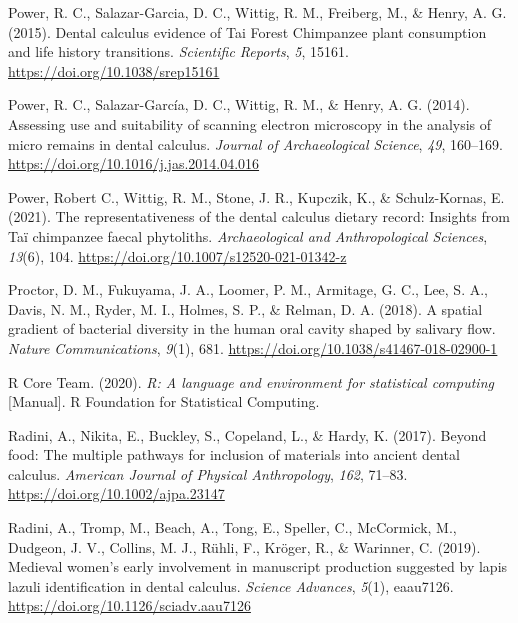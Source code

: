 \documentclass[
  b5paper,
]{book}
\newlength{\cslhangindent}
\newenvironment{CSLReferences}[2] %
 {\begin{list}{}{%
  \setlength{\itemindent}{0pt}
  \setlength{\leftmargin}{0pt}
  \setlength{\parsep}{0pt}
  \ifodd #1
   \setlength{\leftmargin}{\cslhangindent}
   \setlength{\itemindent}{-1\cslhangindent}
  \fi
  \setlength{\itemsep}{#2\baselineskip}}}
 {\end{list}}
\begin{document}
\begin{CSLReferences}{1}{0}
Power, R. C., Salazar-Garcia, D. C., Wittig, R. M., Freiberg, M., \&
Henry, A. G. (2015). Dental calculus evidence of {Tai Forest Chimpanzee}
plant consumption and life history transitions. \emph{Scientific
Reports}, \emph{5}, 15161. \url{https://doi.org/10.1038/srep15161}

Power, R. C., Salazar-García, D. C., Wittig, R. M., \& Henry, A. G.
(2014). Assessing use and suitability of scanning electron microscopy in
the analysis of micro remains in dental calculus. \emph{Journal of
Archaeological Science}, \emph{49}, 160--169.
\url{https://doi.org/10.1016/j.jas.2014.04.016}

Power, Robert C., Wittig, R. M., Stone, J. R., Kupczik, K., \&
Schulz-Kornas, E. (2021). The representativeness of the dental calculus
dietary record: Insights from {Taï} chimpanzee faecal phytoliths.
\emph{Archaeological and Anthropological Sciences}, \emph{13}(6), 104.
\url{https://doi.org/10.1007/s12520-021-01342-z}

Proctor, D. M., Fukuyama, J. A., Loomer, P. M., Armitage, G. C., Lee, S.
A., Davis, N. M., Ryder, M. I., Holmes, S. P., \& Relman, D. A. (2018).
A spatial gradient of bacterial diversity in the human oral cavity
shaped by salivary flow. \emph{Nature Communications}, \emph{9}(1), 681.
\url{https://doi.org/10.1038/s41467-018-02900-1}

R Core Team. (2020). \emph{R: {A} language and environment for
statistical computing} {[}Manual{]}. {R Foundation for Statistical
Computing}.

Radini, A., Nikita, E., Buckley, S., Copeland, L., \& Hardy, K. (2017).
Beyond food: {The} multiple pathways for inclusion of materials into
ancient dental calculus. \emph{American Journal of Physical
Anthropology}, \emph{162}, 71--83.
\url{https://doi.org/10.1002/ajpa.23147}

Radini, A., Tromp, M., Beach, A., Tong, E., Speller, C., McCormick, M.,
Dudgeon, J. V., Collins, M. J., Rühli, F., Kröger, R., \& Warinner, C.
(2019). Medieval women's early involvement in manuscript production
suggested by lapis lazuli identification in dental calculus.
\emph{Science Advances}, \emph{5}(1), eaau7126.
\url{https://doi.org/10.1126/sciadv.aau7126}


\end{CSLReferences}
\end{document}
